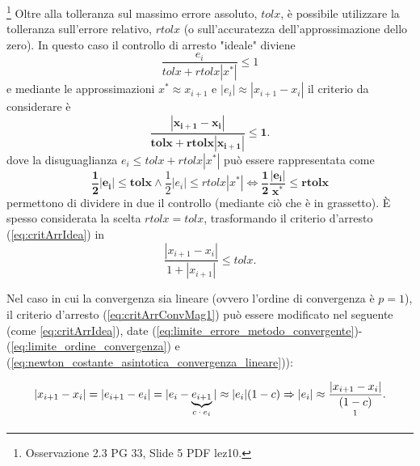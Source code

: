 \begin{remark}\footnote{Osservazione 2.3 PG 33, Slide 5 PDF lez10.}
	Oltre alla tolleranza sul massimo errore assoluto, $tolx$, è possibile utilizzare la tolleranza sull'errore relativo, $rtolx$ (o sull'accuratezza dell'approssimazione dello zero). In questo caso il controllo di arresto "ideale" diviene
	\begin{equation*}
		\frac{e_i}{tolx+rtolx|x^*|}\leq 1
	\end{equation*}
	e mediante le approssimazioni $x^*\approx x_{i+1}$ e $|e_i|\approx |x_{i+1}-x_i|$ il criterio da considerare è
	\begin{equation}\label{eq:critArrIdea}
		\boldsymbol{\frac{|x_{i+1}-x_i|}{tolx+rtolx|x_{i+1}|}\leq 1}.
	\end{equation}
	dove la disuguaglianza $e_i\leq tolx+rtolx|x^*|$ può essere rappresentata come
	\begin{equation*}
		\boldsymbol{\frac{1}{2}|e_i|\leq tolx} \wedge \frac{1}{2}|e_i|\leq rtolx|x^*| \iff \boldsymbol{\frac{1}{2}\frac{|e_i|}{x^*}\leq rtolx}
	\end{equation*}
	permettono di dividere in due il controllo (mediante ciò che è in grassetto). È spesso considerata la scelta $rtolx=tolx$, trasformando il criterio d'arresto (\ref{eq:critArrIdea}) in
	\begin{equation*}
		\frac{|x_{i+1}-x_i|}{1+|x_{i+1}|}\leq tolx.
	\end{equation*}
\end{remark}

Nel caso in cui la convergenza sia lineare (ovvero l'ordine di convergenza è $p=1$), il criterio d'arresto (\ref{eq:critArrConvMag1}) può essere modificato nel seguente (come \ref{eq:critArrIdea}), date (\ref{eq:limite_errore_metodo_convergente})-(\ref{eq:limite_ordine_convergenza}) e (\ref{eq:newton_costante_asintotica_convergenza_lineare})):

\begin{equation}\label{eq:approxErroreNewtonBis}
	|x_{i+1}-x_i|=|e_{i+1}-e_i|=|e_i-\underbrace{e_{i+1}}_\text{$c\cdot e_i$}|\approx |e_i|(1-c)\Rightarrow |e_i|\approx\frac{|x_{i+1}-x_i|}{\underset{\footnotemark}{(1-c)}}.
\end{equation}

